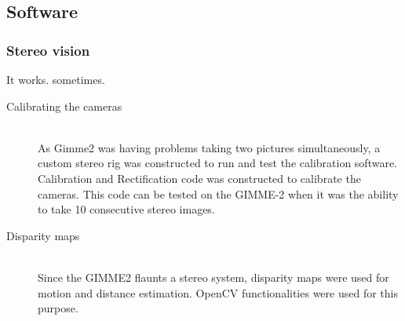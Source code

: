 \subsection{Software}
\subsubsection{Stereo vision}
It works. sometimes.
\begin{description}
  \item [Calibrating the cameras] \hfill \\As Gimme2 was having problems taking two pictures simultaneously, a custom stereo rig was constructed to run and test the calibration software. Calibration and Rectification code was constructed to calibrate the cameras. This code can be tested on the GIMME-2 when it was the ability to take 10 consecutive stereo images.
  \item [Disparity maps] \hfill \\Since the GIMME2 flaunts a stereo system, disparity maps were used for motion and distance estimation. OpenCV functionalities were used for this purpose.

\end{description}

